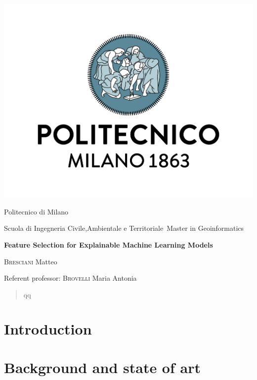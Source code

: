 \documentclass[fontsize=12pt,paper=a4,pagesize=auto]{report}
\begin{document}
\begin{titlepage}
	\centering
	\includegraphics[scale = 0.20]{images/polimi.jpg}\par
	{\Large
		Politecnico di Milano\par
		Scuola di Ingegneria Civile,Ambientale e Territoriale\
		Master in Geoinformatics\par}
			\vspace{0.5cm}
	{\huge\bfseries
		Feature Selection for Explainable Machine Learning Models\\\par}
	\vspace{1cm}
	{\Large
		{\scshape Bresciani} Matteo\par}
	\vfill
	Referent professor: {\scshape Brovelli} Maria Antonia\par
	\vfill
\end{titlepage}




\begin{abstract}

qq
\end{abstract}
\tableofcontents

\chapter{Introduction}
 

\chapter{Background and state of art}

\end{document}
